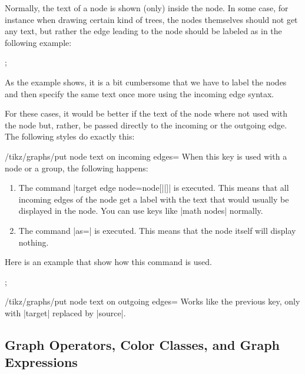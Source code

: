 Normally, the text of a node is shown (only) inside the node. In some case, for
instance when drawing certain kind of trees, the nodes themselves should not
get any text, but rather the edge leading to the node should be labeled as in
the following example:
%
\begin{codeexample}[]
\tikz {};
\end{codeexample}
%
As the example shows, it is a bit cumbersome that we have to label the nodes
and then specify the same text once more using the incoming edge syntax.

For these cases, it would be better if the text of the node where not used with
the node but, rather, be passed directly to the incoming or the outgoing edge.
The following styles do exactly this:

\begin{key}{/tikz/graphs/put node text on incoming edges=}
    When this key is used with a node or a group, the following happens:
    \begin{enumerate}
        \item The command
            |target edge node={node[||]{\tikzgraphnodetext}}| is
            executed. This means that all incoming edges of the node get a
            label with the text that would usually be displayed in the node.
            You can use keys like |math nodes| normally.
        \item The command |as={}| is executed. This means that the node itself
            will display nothing.
    \end{enumerate}
    Here is an example that show how this command is used.
\begin{codeexample}[]
\tikz {};
\end{codeexample}
\end{key}

\begin{key}{/tikz/graphs/put node text on outgoing edges=}
    Works like the previous key, only with |target| replaced by |source|.
\end{key}


\subsection{Graph Operators, Color Classes, and Graph Expressions}
\label{section-library-graphs-color-classes}

